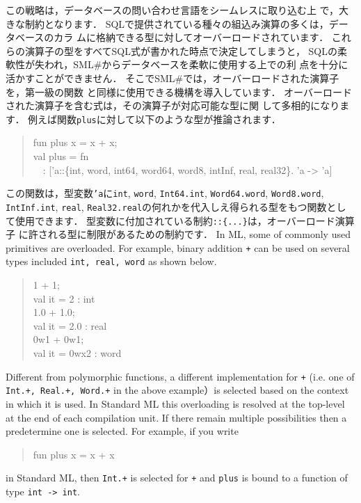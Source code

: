 \documentclass{jbook}
\newcommand{\smlsharp}{SML\#}
\newcommand{\myem}{\mbox{\ \ }}
\begin{document}
	この戦略は，データベースの問い合わせ言語をシームレスに取り込む上
で，大きな制約となります．
	SQLで提供されている種々の組込み演算の多くは，データベースのカラ
ムに格納できる型に対してオーバーロードされています．
	これらの演算子の型をすべてSQL式が書かれた時点で決定してしまうと，
SQLの柔軟性が失われ，\smlsharp{}からデータベースを柔軟に使用する上での利
点を十分に活かすことができません．
	そこで\smlsharp{}では，オーバーロードされた演算子を，第一級の関数
と同様に使用できる機構を導入しています．
	オーバーロードされた演算子を含む式は，その演算子が対応可能な型に関
して多相的になります．
	例えば関数{\tt plus}に対して以下のような型が推論されます．
\begin{tt}
\begin{quote}
fun plus x = x + x;\\
val plus = fn\\
\myem  : ['a::\{int, word, int64, word64, word8, intInf, real, real32\}. 'a -> 'a]
\end{quote}
\end{tt}
	この関数は，型変数{\tt 'a}に{\tt int}, {\tt word}, {\tt Int64.int},
{\tt Word64.word},
{\tt Word8.word},
{\tt IntInf.int},
{\tt real},
{\tt Real32.real}の何れかを代入しえ得られる型をもつ関数とし
て使用できます．
	型変数に付加されている制約{\tt ::\{...\}}は，オーバーロード演算子
に許される型に制限があるための制約です．
\else%
	In ML, some of commonly used primitives are overloaded.
	For example, binary addition {\tt +} can be used on several
types included {\tt int, real, word} as shown below.
\begin{tt}
\begin{quote}
1 + 1;\\
val it = 2 : int\\
1.0 + 1.0;\\
val it = 2.0 : real\\
0w1 + 0w1;\\
val it = 0wx2 : word
\end{quote}
\end{tt}
	Different from polymorphic functions, a different implementation
for {\tt +} (i.e. one of {\tt Int.+, Real.+, Word.+} in the above
example）is selected based on the context in which it is used. 
	In Standard ML this overloading is resolved at the top-level
at the end of each compilation unit.
	If there remain multiple possibilities then a predetermine one
is selected.
	For example, if you write 
\begin{tt}
\begin{quote}
fun plus x = x + x
\end{quote}
\end{tt}
in Standard ML, then {\tt Int.+}  is selected for {\tt +} and {\tt plus}
is bound to a function of type {\tt int -> int}.
	
\end{document}
